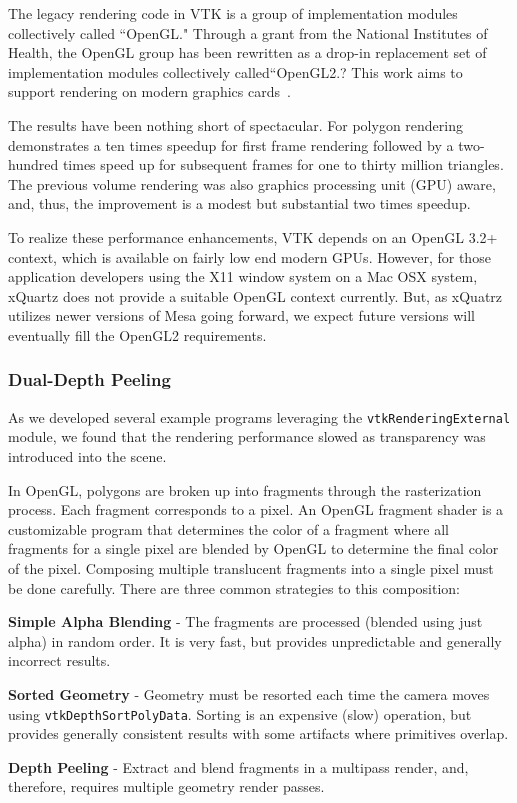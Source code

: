 The legacy rendering code in VTK is a group of implementation modules collectively called ``OpenGL." Through a grant from the National Institutes of Health, the OpenGL group has been rewritten as a drop-in replacement set of implementation modules collectively called``OpenGL2.? This work aims to support rendering on modern graphics cards~\cite{Hanwell:2015}.

The results have been nothing short of spectacular. For polygon rendering demonstrates a ten times speedup for first frame rendering followed by a two-hundred times speed up for subsequent frames for one to thirty million triangles. The previous volume rendering was also graphics processing unit (GPU) aware, and, thus, the improvement is a modest but substantial two times speedup. 

To realize these performance enhancements, VTK depends on an OpenGL 3.2+ context, which is available on fairly low end modern GPUs. However, for those application developers using the X11 window system on a Mac OSX system, xQuartz does not provide a suitable OpenGL context currently. But, as xQuatrz utilizes newer versions of Mesa going forward, we expect future versions will eventually fill the OpenGL2 requirements.

\subsubsection{Dual-Depth Peeling}

As we developed several example programs leveraging the \texttt{vtkRenderingExternal} module, we found that the rendering performance slowed as transparency was introduced into the scene. 

In OpenGL, polygons are broken up into fragments through the rasterization process. Each fragment corresponds to a pixel. An OpenGL fragment shader is a customizable program that determines the color of a fragment where all fragments for a single pixel are blended by OpenGL to determine the final color of the pixel. Composing multiple translucent fragments into a single pixel must be done carefully. There are three common strategies to this composition:

\begin{compactitem}
\item \textbf{Simple Alpha Blending} - The fragments are processed (blended using just alpha) in random order. It is very fast, but provides unpredictable and generally incorrect results.
\item \textbf{Sorted Geometry} - Geometry must be resorted each time the camera moves using \texttt{vtkDepthSortPolyData}. Sorting is an expensive (slow) operation, but provides generally consistent results with some artifacts where primitives overlap.
\item \textbf{Depth Peeling} - Extract and blend fragments in a multipass render, and, therefore, requires multiple geometry render passes.
\end{compactitem}

